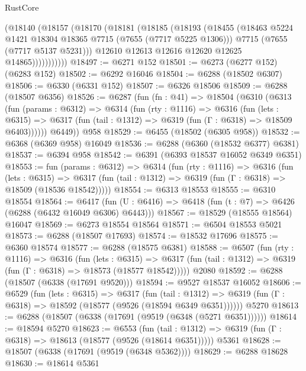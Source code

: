\begin{lexlean}{RustCore}
\begin{coremodule}
              (@18140
                (@18157
                  (@18170
                    (@18181
                      (@18185
                        (@18193
                          (@18455
                            (@18463 @5224 @1421 @18304 @18365 @7715 (@7655 (@7717 @5225 @1306)))
                            @7715
                            (@7655 (@7717 @5137 @5231)))
                          @12610
                          @12613
                          @12616
                          @12620
                          @12625
                          @14865)))))))))))
@18497 := @6271 @152
@18501 := @6273 (@6277 @152) (@6283 @152)
@18502 := @6292 @16046
@18504 := @6288 (@18502 @6307)
@18506 := @6330 (@6331 @152)
@18507 := @6326 @18506
@18509 := @6288 (@18507 @6356)
@18526 := @6287
    (fun (fn : @41) =>
    @18504
      (@6310
        (@6313
          (fun (params : @6312) =>
          @6314
            (fun (rty : @1116) =>
            @6316
              (fun (lets : @6315) =>
              @6317 (fun (tail : @1312) => @6319 (fun (Γ : @6318) => @18509 @6403))))))
        @6449))
    @958
@18529 := @6455 (@18502 (@6305 @958))
@18532 := @6368 (@6369 @958) @16049
@18536 := @6288 (@6360 (@18532 @6377) @6381)
@18537 := @6394 @958
@18542 := @6391 (@6393 @18537 @16052 @6349 @6351)
@18553 := fun (params : @6312) =>
  @6314
    (fun (rty : @1116) =>
    @6316
      (fun (lets : @6315) =>
      @6317 (fun (tail : @1312) => @6319 (fun (Γ : @6318) => @18509 (@18536 @18542)))))
@18554 := @6313 @18553
@18555 := @6310 @18554
@18564 := @6417
    (fun (U : @6416) => @6418 (fun (t : @7) => @6426 (@6288 (@6432 @16049 @6306) @6443)))
@18567 := @18529 (@18555 @18564) @16047
@18569 := @6273 @18554 @18564
@18571 := @6504 @18553 @5021
@18573 := @6288 (@18507 @17693)
@18574 := @18532 @17696
@18575 := @6360 @18574
@18577 := @6288 (@18575 @6381)
@18588 := @6507
    (fun (rty : @1116) =>
    @6316
      (fun (lets : @6315) =>
      @6317 (fun (tail : @1312) => @6319 (fun (Γ : @6318) => @18573 (@18577 @18542)))))
    @2080
@18592 := @6288 (@18507 (@6338 (@17691 @9520)))
@18594 := @9527 @18537 @16052
@18606 := @6529
    (fun (lets : @6315) =>
    @6317
      (fun (tail : @1312) =>
      @6319 (fun (Γ : @6318) => @18592 (@18577 (@9526 (@18594 @6349 @6351))))))
    @5270
@18613 := @6288 (@18507 (@6338 (@17691 (@9519 (@6348 (@5271 @6351))))))
@18614 := @18594 @5270
@18623 := @6553
    (fun (tail : @1312) => @6319 (fun (Γ : @6318) => @18613 (@18577 (@9526 (@18614 @6351)))))
    @5361
@18628 := @18507 (@6338 (@17691 (@9519 (@6348 @5362))))
@18629 := @6288 @18628
@18630 := @18614 @5361

\end{coremodule}
\end{lexlean}

